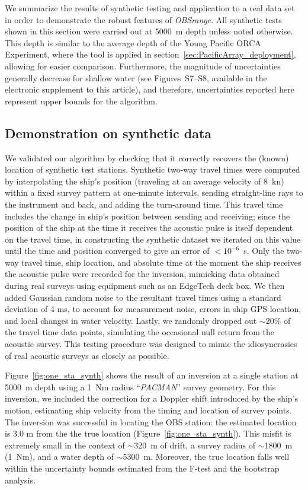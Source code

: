 We summarize the results of synthetic testing and application to a real data set in order to demonstrate the robust features of \textit{OBSrange}. All synthetic tests shown in this section were carried out at 5000~m depth unless noted otherwise. This depth is similar to the average depth of the Young Pacific ORCA Experiment, where the tool is applied in section~\ref{sec:PacificArray_deployment}, allowing for easier comparison. Furthermore, the magnitude of uncertainties generally decrease for shallow water (see Figures~S7--S8, available in the electronic supplement to this article), and therefore, uncertainties reported here represent upper bounds for the algorithm.

\subsection{Demonstration on synthetic data} \label{Demonstration on synthetic data}
We validated our algorithm by checking that it correctly recovers the (known) location of synthetic test stations. Synthetic two-way travel times were computed by interpolating the ship's position (traveling at an average velocity of 8~kn) within a fixed survey pattern at one-minute intervals, sending straight-line rays to the instrument and back, and adding the turn-around time. This travel time includes the change in ship's position between sending and receiving; since the position of the ship at the time it receives the acoustic pulse is itself dependent on the travel time, in constructing the synthetic dataset we iterated on this value until the time and position converged to give an error of \mbox{$<10^{-6}$ s}. Only the two-way travel time, ship location, and absolute time at the moment the ship receives the acoustic pulse were recorded for the inversion, mimicking data obtained during real surveys using equipment such as an EdgeTech deck box. We then added Gaussian random noise to the resultant travel times using a standard deviation of 4 ms, to account for measurement noise, errors in ship GPS location, and local changes in water velocity. Lastly, we randomly dropped out $\sim$20\% of the travel time data points, simulating the occasional null return from the acoustic survey. This testing procedure was designed to mimic the idiosyncrasies of real acoustic surveys as closely as possible. 

Figure~\ref{fig:one_sta_synth} shows the result of an inversion at a single station at 5000~m depth using a 1~Nm radius ``\textit{PACMAN}'' survey geometry. For this inversion, we included the correction for a Doppler shift introduced by the ship's motion, estimating ship velocity from the timing and location of survey points. The inversion was successful in locating the OBS station: the estimated location is 3.0 m from the the true location (Figure~\ref{fig:one_sta_synth}). This misfit is extremely small in the context of $\sim$320~m of drift, a survey radius of $\sim$1800~m (1~Nm), and a water depth of $\sim$5300~m. Moreover, the true location falls well within the uncertainty bounds estimated from the F-test and the bootstrap analysis. 

